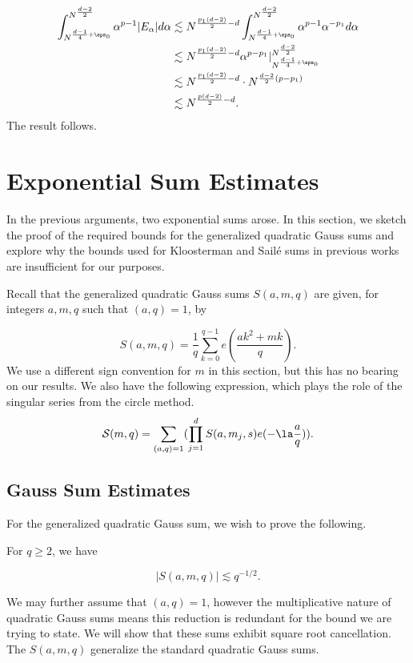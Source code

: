 \documentclass[11pt]{amsart}
\begin{document}
\begin{align*}
    \int_{N^{\frac{d-1}{4}+\eps_0}}^{N^{\frac{d-2}{2}}}\alpha^{p-1}|E_\alpha|d\alpha&\lesssim  N^{\frac{p_1(d-2)}{2}-d}\int_{N^{\frac{d-1}{4}+\eps_0}}^{N^{\frac{d-2}{2}}}\alpha^{p-1}\alpha^{-p_1}d\alpha\\
    &\lesssim  N^{\frac{p_1(d-2)}{2}-d} \alpha^{p-p_1}\rvert_{N^{\frac{d-1}{4}+\eps_0}}^{N^{\frac{d-2}{2}}}\\
    &\lesssim   N^{\frac{p_1(d-2)}{2}-d}\cdot N^{\frac{d-2}{2}(p-p_1)}\\
    &\lesssim N^{\frac{p(d-2)}{2}-d}.
\end{align*}
The result follows.
\section{Exponential Sum Estimates}\label{SectionExpSumEstimates}
In the previous arguments, two exponential sums arose. In this section, we sketch the proof of the required bounds for the generalized quadratic Gauss sums and explore why the bounds used for Kloosterman and Sail\'e sums in previous works are insufficient for our purposes. 

Recall that the generalized quadratic Gauss sums $S(a,m,q)$ are given, for integers $a,m,q$ such that $(a,q)=1$, by

\begin{equation}\label{4: S(a,m,q)DefEqn}
    S(a,m,q) = \frac{1}{q}\sum_{k=0}^{q-1}e(\frac{ak^2+mk}{q}).  
\end{equation}
We use a different sign convention for $m$ in this section, but this has no bearing on our results. We also have the following expression, which plays the role of the singular series from the circle method.
\begin{equation}\label{4: FancyS(m,q)DefEqn}
    \mathcal{S}(m,q) = \sum_{(a,q)=1}(\prod_{j=1}^dS(a,m_j,s)e(-\la \frac{a}{q})). 
\end{equation}

\subsection{Gauss Sum Estimates}\label{4: SubsectionGaussSumEstimates}
For the generalized quadratic Gauss sum, we wish to prove the following.

\begin{proposition}\label{4: GaussSumBoundProp}
    For $q\geq 2$, we have 

    \begin{equation}\label{4: GaussSumBoundEqn}
        |S(a,m,q)|\lesssim q^{-1/2}.
    \end{equation}
\end{proposition}
We may further assume that $(a,q)=1$, however the multiplicative nature of quadratic Gauss sums means this reduction is redundant for the bound we are trying to state. We will show that these sums exhibit square root cancellation. The $S(a,m,q)$ generalize the standard quadratic Gauss sums.
\end{document}
